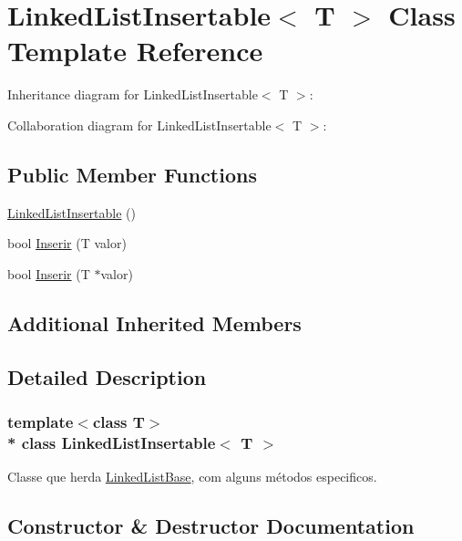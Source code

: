 \hypertarget{class_linked_list_insertable}{}\section{Linked\+List\+Insertable$<$ T $>$ Class Template Reference}
\label{class_linked_list_insertable}


Inheritance diagram for Linked\+List\+Insertable$<$ T $>$\+:


Collaboration diagram for Linked\+List\+Insertable$<$ T $>$\+:
\subsection*{Public Member Functions}
\begin{DoxyCompactItemize}
\item 
\hyperlink{class_linked_list_insertable_a3ac03c0b6a9e34bf304559d9e64feea3}{Linked\+List\+Insertable} ()
\item 
bool \hyperlink{class_linked_list_insertable_ab4fc0cd7ba1c7ef65f7702a0f9465cd1}{Inserir} (T valor)
\item 
bool \hyperlink{class_linked_list_insertable_aeb642ea0257d642681ed01d63e709093}{Inserir} (T $\ast$valor)
\end{DoxyCompactItemize}
\subsection*{Additional Inherited Members}


\subsection{Detailed Description}
\subsubsection*{template$<$class T$>$\\*
class Linked\+List\+Insertable$<$ T $>$}

Classe que herda \hyperlink{class_linked_list_base}{Linked\+List\+Base}, com alguns métodos especificos. 

\subsection{Constructor \& Destructor Documentation}
